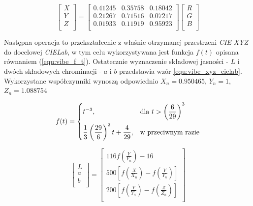 	\begin{equation}
		\begin{bmatrix}
			X \\
			Y \\
			Z \\
		\end{bmatrix}
		=
		\begin{bmatrix}
			0.41245 & 0.35758 & 0.18042 \\
			0.21267 & 0.71516 & 0.07217 \\
			0.01933 & 0.11919 & 0.95923 \\
		\end{bmatrix}
		\begin{bmatrix}
			R \\
			G \\
			B \\
		\end{bmatrix}
	\label{equ:vibe_rgb_xyz}	
	\end{equation}	 

Następna operacja to przekształcenie z właśnie otrzymanej przestrzeni \textit{CIE XYZ} do docelowej \textit{CIELab}, w tym celu wykorzystywana jest funkcja $f(t)$ opisana równaniem (\ref{equ:vibe_f_t}). Ostatecznie wyznaczenie składowej jasności - $L$ i dwóch składowych chrominacji - $a$ i $b$ przedstawia wzór \ref{equ:vibe_xyz_cielab}. Wykorzystane współczynniki wynoszą odpowiednio $X_n = 0.950465$, $Y_n = 1$, $Z_n = 1.088754$

	\begin{equation}
	    f(t) = 
		\begin{dcases}
    		t^{-3}, & \text{dla } t > \left( \frac{6}{29} \right)^3 \\
    		\frac{1}{3} \left( \frac{29}{6} \right)^2 t + \frac{4}{29}, 
    		& \text{w przeciwnym razie} 
		\end{dcases}
	\label{equ:vibe_f_t}	
	\end{equation}


	\begin{equation}
		\begin{bmatrix}
			L \\
			a \\
			b \\
		\end{bmatrix}
		=
		\begin{bmatrix}
			116 f(\frac{Y}{Y_n}) - 16 \\
			500 \left[ f(\frac{X}{X_n}) - f(\frac{Y}{Y_n}) \right]\\
			200 \left[ f(\frac{Y}{Y_n}) - f(\frac{Z}{Z_n}) \right] \\
		\end{bmatrix}
	\label{equ:vibe_xyz_cielab}
	\end{equation}

